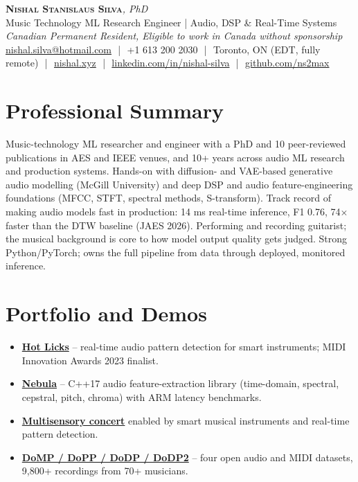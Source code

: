 \documentclass[11pt]{article}
\newcommand{\cvName}{Nishal Stanislaus Silva}
\newcommand{\cvStatus}{Canadian Permanent Resident, Eligible to work in Canada without sponsorship}
\newcommand{\cvTagline}{Music Technology ML Research Engineer | Audio, DSP \& Real-Time Systems}
\begin{document}
\pagestyle{empty}
\begin{center}
    {\LARGE \scshape \textbf{\cvName}}{\large \textit{, PhD}}
    \\[1pt]
    {\small \cvTagline}
    \\[1pt]
    {\footnotesize\textit{\cvStatus}}
    \\[1pt]
    {\small
    \href{mailto:nishal.silva@hotmail.com}{nishal.silva@hotmail.com}
    \,\,|\,\, +1 613 200 2030
    \,\,|\,\, Toronto, ON (EDT, fully remote)
    \,\,|\,\, \href{https://nishal.xyz}{nishal.xyz}
    \,\,|\,\, \href{https://www.linkedin.com/in/nishal-silva}{linkedin.com/in/nishal-silva}
    \,\,|\,\, \href{https://github.com/ns2max}{github.com/ns2max}}
\end{center}

\section*{Professional Summary}

Music-technology ML researcher and engineer with a PhD and 10 peer-reviewed publications in AES and IEEE venues, and 10+ years across audio ML research and production systems. Hands-on with diffusion- and VAE-based generative audio modelling (McGill University) and deep DSP and audio feature-engineering foundations (MFCC, STFT, spectral methods, S-transform). Track record of making audio models fast in production: 14 ms real-time inference, F1 0.76, 74$\times$ faster than the DTW baseline (JAES 2026). Performing and recording guitarist; the musical background is core to how model output quality gets judged. Strong Python/PyTorch; owns the full pipeline from data through deployed, monitored inference.

\section*{Portfolio and Demos \footnotesize {}}
\begin{itemize}[leftmargin=1.2em, itemsep=-0.25em]
    \item \href{https://youtu.be/gkOqfOT8zXM}{\textbf{Hot Licks}} -- real-time audio pattern detection for smart instruments; MIDI Innovation Awards 2023 finalist.
    \item \href{https://github.com/ns2max/nebula}{\textbf{Nebula}} -- C++17 audio feature-extraction library (time-domain, spectral, cepstral, pitch, chroma) with ARM latency benchmarks.
    \item \href{https://youtu.be/axEHkdnxFB8}{\textbf{Multisensory concert}} enabled by smart musical instruments and real-time pattern detection.
    \item \href{https://zenodo.org/record/10818617}{\textbf{DoMP / DoPP / DoDP / DoDP2}} -- four open audio and MIDI datasets, 9,800+ recordings from 70+ musicians.
\end{itemize}
\end{document}
